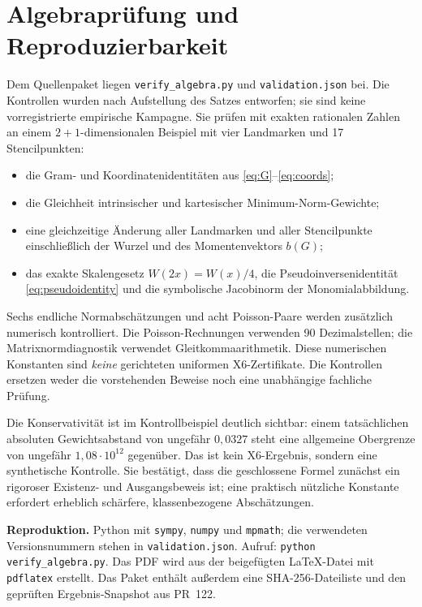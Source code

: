 \documentclass[11pt,a4paper]{article}
\theoremstyle{definition}\newtheorem{definition}{Definition}
\theoremstyle{remark}\newtheorem*{remark}{Bemerkung}
\begin{document}
\appendix
\section{Algebraprüfung und Reproduzierbarkeit}

Dem Quellenpaket liegen \texttt{verify\_algebra.py} und \texttt{validation.json} bei. Die Kontrollen wurden nach Aufstellung des Satzes entworfen; sie sind keine vorregistrierte empirische Kampagne. Sie prüfen mit exakten rationalen Zahlen an einem $2+1$-dimensionalen Beispiel mit vier Landmarken und 17 Stencilpunkten:
\begin{itemize}
 \item die Gram- und Koordinatenidentitäten aus \eqref{eq:G}--\eqref{eq:coords};
 \item die Gleichheit intrinsischer und kartesischer Minimum-Norm-Gewichte;
 \item eine gleichzeitige Änderung aller Landmarken und aller Stencilpunkte einschließlich der Wurzel und des Momentenvektors $b(G)$;
 \item das exakte Skalengesetz $W(2x)=W(x)/4$, die Pseudoinversenidentität \eqref{eq:pseudoidentity} und die symbolische Jacobinorm der Monomialabbildung.
\end{itemize}
Sechs endliche Normabschätzungen und acht Poisson-Paare werden zusätzlich numerisch kontrolliert. Die Poisson-Rechnungen verwenden 90 Dezimalstellen; die Matrixnormdiagnostik verwendet Gleitkommaarithmetik. Diese numerischen Konstanten sind \emph{keine} gerichteten uniformen X6-Zertifikate. Die Kontrollen ersetzen weder die vorstehenden Beweise noch eine unabhängige fachliche Prüfung.

Die Konservativität ist im Kontrollbeispiel deutlich sichtbar: einem tatsächlichen absoluten Gewichtsabstand von ungefähr $0{,}0327$ steht eine allgemeine Obergrenze von ungefähr $1{,}08\cdot10^{12}$ gegenüber. Das ist kein X6-Ergebnis, sondern eine synthetische Kontrolle. Sie bestätigt, dass die geschlossene Formel zunächst ein rigoroser Existenz- und Ausgangsbeweis ist; eine praktisch nützliche Konstante erfordert erheblich schärfere, klassenbezogene Abschätzungen.

\textbf{Reproduktion.} Python mit \texttt{sympy}, \texttt{numpy} und \texttt{mpmath}; die verwendeten Versionsnummern stehen in \texttt{validation.json}. Aufruf: \texttt{python verify\_algebra.py}. Das PDF wird aus der beigefügten LaTeX-Datei mit \texttt{pdflatex} erstellt. Das Paket enthält außerdem eine SHA-256-Dateiliste und den geprüften Ergebnis-Snapshot aus PR~122.
\end{document}
